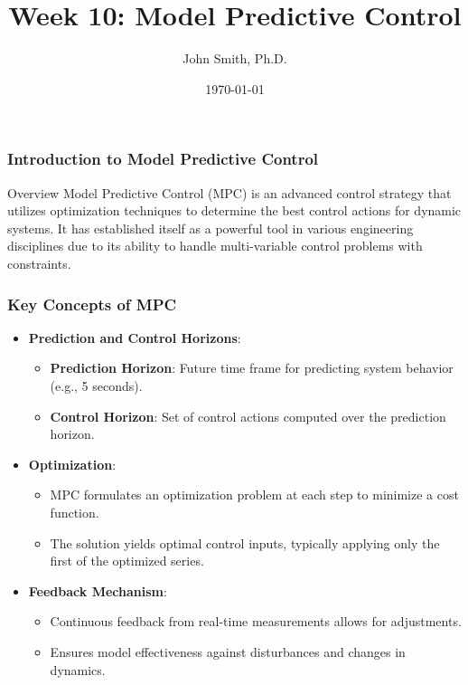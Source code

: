 \documentclass[aspectratio=169]{beamer}
\title[Model Predictive Control]{Week 10: Model Predictive Control}
\author[J. Smith]{John Smith, Ph.D.}
\institute[University Name]{
  Department of Computer Science\\
  University Name\\
  \vspace{0.3cm}
  Email: email@university.edu\\
  Website: www.university.edu
}
\date{\today}
\begin{document}
\frame{\titlepage}

\begin{frame}[fragile]
    \frametitle{Introduction to Model Predictive Control}
    \begin{block}{Overview}
        Model Predictive Control (MPC) is an advanced control strategy that utilizes optimization techniques to determine the best control actions for dynamic systems. It has established itself as a powerful tool in various engineering disciplines due to its ability to handle multi-variable control problems with constraints.
    \end{block}
\end{frame}

\begin{frame}[fragile]
    \frametitle{Key Concepts of MPC}
    \begin{itemize}
        \item \textbf{Prediction and Control Horizons}:
        \begin{itemize}
            \item \textbf{Prediction Horizon}: Future time frame for predicting system behavior (e.g., 5 seconds).
            \item \textbf{Control Horizon}: Set of control actions computed over the prediction horizon.
        \end{itemize}
        
        \item \textbf{Optimization}:
        \begin{itemize}
            \item MPC formulates an optimization problem at each step to minimize a cost function.
            \item The solution yields optimal control inputs, typically applying only the first of the optimized series.
        \end{itemize}
        
        \item \textbf{Feedback Mechanism}:
        \begin{itemize}
            \item Continuous feedback from real-time measurements allows for adjustments.
            \item Ensures model effectiveness against disturbances and changes in dynamics.
        \end{itemize}
    \end{itemize}
\end{frame}
\end{document}
